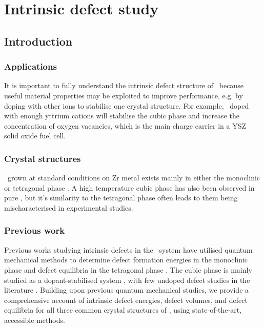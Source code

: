 \chapter{Intrinsic defect study}

\label{ch:results1} %

\section{Introduction} %
\subsection{Applications} %

It is important to fully understand the intrinsic defect structure of \zirconia\ because useful material properties may be exploited to improve performance, e.g. by doping with other ions to stabilise one crystal structure. For example, \zirconia\ doped with enough yttrium cations will stabilise the cubic phase and increase the concentration of oxygen vacancies, which is the main charge carrier in a YSZ solid oxide fuel cell.

\subsection{Crystal structures} %

\zirconia\ grown at standard conditions on Zr metal exists mainly in either the monoclinic or tetragonal phase \cite{Howard1988,teufer1962crystal}. A high temperature cubic phase has also been observed in pure \zirconia , but it's similarity to the tetragonal phase often leads to them being mischaracterised in experimental studies. 

\subsection{Previous work} %

Previous works studying intrinsic defects in the \zirconia\ system have utilised quantum mechanical methods to determine defect formation energies in the monoclinic phase \cite{zheng2007first,foster2002modelling,foster2001structure} and defect equilibria in the tetragonal phase \cite{youssef2012intrinsic}. The cubic phase is mainly studied as a dopant-stabilised system \cite{orera1990intrinsic,jiang2011first}, with few undoped defect studies in the literature \cite{mackrodt1986theoretical,aarhammar2009energetics}. Building upon previous quantum mechanical studies, we provide a comprehensive account of intrinsic defect energies, defect volumes, and defect equilibria for all three common crystal structures of \zirconia , using state-of-the-art, accessible methods.

